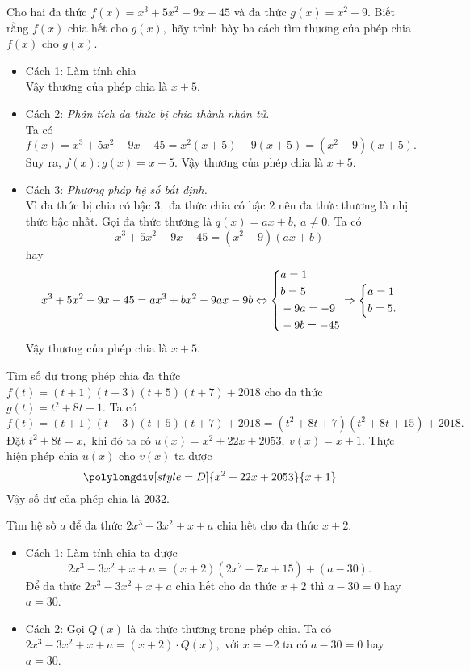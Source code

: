 \begin{vn} %
	Cho hai đa thức $f(x)=x^3+5x^2-9x-45$ và đa thức $g(x)=x^2-9.$ Biết rằng $f(x)$ chia hết cho $g(x),$ hãy trình bày ba cách tìm thương của phép chia $f(x)$ cho $g(x).$
	\loigiai
	{
	\begin{itemize}
		\item Cách 1: Làm tính chia 
		\\
		Vậy thương của phép chia là $x+5.$
		\item Cách 2: {\it Phân tích đa thức bị chia thành nhân tử.}\\
		Ta có $f(x)=x^3+5x^2-9x-45=x^2(x+5)-9(x+5)=(x^2-9)(x+5).$\\
		Suy ra, $f(x):g(x)=x+5.$ Vậy thương của phép chia là $x+5.$
		\item  Cách 3: {\it Phương pháp hệ số bất định.} \\
		Vì đa thức bị chia có bậc $3,$ đa thức chia có bậc $2$ nên đa thức thương là nhị thức bậc nhất. Gọi đa thức thương là $q(x)=ax+b,\ a\ne0.$ Ta có
		\[x^3+5x^2-9x-45=(x^2-9)(ax+b)\] hay 
		\[x^3+5x^2-9x-45=ax^3+bx^2-9ax-9b\Leftrightarrow\left\{\begin{aligned}&a=1\\&b=5\\&-9a=-9\\&-9b=-45\end{aligned}\right.\Rightarrow\left\{\begin{aligned}&a=1\\&b=5.\end{aligned}\right.\]
		Vậy thương của phép chia là $x+5.$		
\end{itemize}
	}
\end{vn}
\begin{vn} %
	Tìm số dư trong phép chia đa thức $f(t)=(t+1)(t+3)(t+5)(t+7)+2018$ cho đa thức $g(t)=t^2+8t+1.$
	\loigiai
	{
Ta có $f(t)=(t+1)(t+3)(t+5)(t+7)+2018=(t^2+8t+7)(t^2+8t+15)+2018.$ \\Đặt $t^2+8t=x,$ khi đó ta có $u(x)=x^2+22x+2053,\ v(x)=x+1.$ Thực hiện phép chia $u(x)$ cho $v(x)$ ta được
	\[\polylongdiv[style=D]{x^2+22x+2053}{x+1}\]
	Vậy số dư của phép chia là $2032.$
}
	\end{vn}
\begin{vn} %
	Tìm hệ số $a$ để đa thức $2x^3-3x^2+x+a$ chia hết cho đa thức $x+2$.
	\loigiai
	{
	\begin{itemize}
		\item Cách 1: Làm tính chia ta được \[2x^3-3x^2+x+a=(x+2)(2x^2-7x+15)+(a-30).\]
		Để đa thức $2x^3-3x^2+x+a$ chia hết cho đa thức $x+2$ thì $a-30=0$ hay $a=30$.
		\item  Cách 2:  Gọi $Q(x)$ là đa thức thương trong phép chia. Ta có $2x^3-3x^2+x+a=(x+2)\cdot Q(x),$ với $x=-2$ ta có $a-30=0$ hay $a=30$.
		\end{itemize}
    }
	\end{vn}
